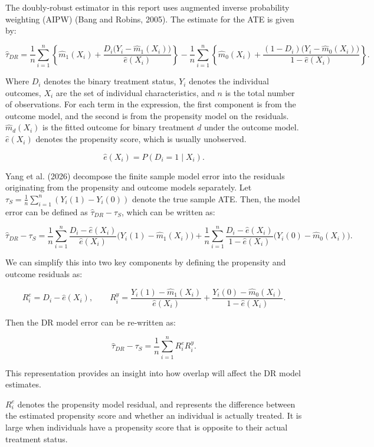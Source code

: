 \documentclass[12pt, oneside]{article}   	%
\begin{document}
The doubly-robust estimator in this report uses augmented inverse probability weighting (AIPW) (Bang and Robins, 2005). The estimate for the ATE is given by:

$$
\hat{\tau}_{DR}
=
\frac{1}{n}\sum_{i=1}^{n}
\left\{
\hat{m}_{1}(X_i)+\frac{D_i\bigl(Y_i-\hat{m}_{1}(X_i)\bigr)}{\hat{e}(X_i)}
\right\}
-
\frac{1}{n}\sum_{i=1}^{n}
\left\{
\hat{m}_{0}(X_i)+\frac{(1-D_i)\bigl(Y_i-\hat{m}_{0}(X_i)\bigr)}{1-\hat{e}(X_i)}
\right\}.
$$

Where $D_{i}$ denotes the binary treatment status, $Y_{i}$ denotes the individual outcomes, $X_{i}$ are the set of individual characteristics, and $n$ is the total number of observations. For each term in the expression, the first component is from the outcome model, and the second is from the propensity model on the residuals. $\hat{m}_{d}(X_{i})$ is the fitted outcome for binary treatment $d$ under the outcome model. $\hat{e}(X_{i})$ denotes the propensity score, which is usually unobserved.

$$
\hat{e}(X_{i})=P(D_{i}=1\mid X_i).
$$

Yang et al. (2026) decompose the finite sample model error into the residuals originating from the propensity and outcome models separately. Let $\tau_{S} = \frac{1}{n}\sum_{i=1}^{n}(Y_{i}(1) - Y_{i}(0))$ denote the true sample ATE. Then, the model error can be defined as $\hat{\tau}_{DR} - \tau_{S}$, which can be written as:

$$
\hat{\tau}_{DR}-\tau_S
=
\frac{1}{n}\sum_{i=1}^{n}
\frac{D_i-\hat{e}(X_i)}{\hat{e}(X_i)}
\bigl(Y_i(1)-\hat{m}_{1}(X_i)\bigr)
+
\frac{1}{n}\sum_{i=1}^{n}
\frac{D_i-\hat{e}(X_i)}{1-\hat{e}(X_i)}
\bigl(Y_i(0)-\hat{m}_{0}(X_i)\bigr).
$$

We can simplify this into two key components by defining the propensity and outcome residuals as:

$$
R_i^{e}=D_i-\hat{e}(X_i),
\qquad
R_i^{y}
=
\frac{Y_i(1)-\hat{m}_{1}(X_i)}{\hat{e}(X_i)}
+
\frac{Y_i(0)-\hat{m}_{0}(X_i)}{1-\hat{e}(X_i)}.
$$

Then the DR model error can be re-written as:

$$
\hat{\tau}_{DR}-\tau_S
=
\frac{1}{n}\sum_{i=1}^{n} R_i^{e}R_i^{y}.
$$


This representation provides an insight into how overlap will affect the DR model estimates.

$R_{i}^{e}$ denotes the propensity model residual, and represents the difference between the estimated propensity score and whether an individual is actually treated. It is large when individuals have a propensity score that is opposite to their actual treatment status.
\end{document}

